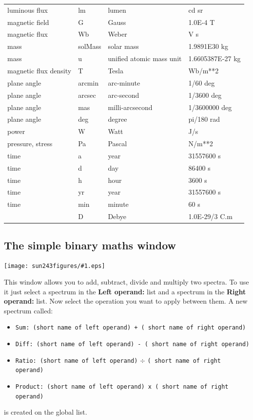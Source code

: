 \documentclass[twoside,11pt]{article}
\newcommand{\htmladdimg}[1]{}
\newcommand{\latexhtml}[2]{#1}
\renewcommand{\_}{\texttt{\symbol{95}}}
\newcommand{\mainfigure}[1]
{\begin{center}
 \latexhtml{\texttt{[image: sun243\_figures/\#1.eps]}}{\htmladdimg{#1.gif}}
 \end{center}
}
\newcommand{\labelitem}[1]{\textbf{#1}}
\newcommand{\hitext}[1]{\texttt{#1}}
\begin{document}
\begin{center}
\begin{tabular}{|l|l|l|l|}
luminous flux & lm & lumen & cd sr \\
magnetic field & G & Gauss & 1.0E-4 T \\
magnetic flux & Wb & Weber & V s \\
mass & solMass & solar mass & 1.9891E30 kg \\
mass & u & unified atomic mass unit & 1.6605387E-27 kg \\
magnetic flux density & T & Tesla & Wb/m**2 \\
plane angle  & arcmin & arc-minute & 1/60 deg \\
plane angle  & arcsec & arc-second & 1/3600 deg \\
plane angle  & mas & milli-arcsecond & 1/3600000 deg \\
plane angle & deg & degree & pi/180 rad \\
power & W & Watt & J/s \\
pressure, stress & Pa & Pascal & N/m**2 \\
time  & a & year & 31557600 s \\
time  & d & day & 86400 s \\
time  & h & hour & 3600 s \\
time  & yr & year & 31557600 s \\
time  & min & minute & 60 s \\
      & D & Debye & 1.0E-29/3 C.m \\
\hline
\end{tabular}
\end{center}

\newpage
\subsection{The simple binary maths window}

\mainfigure{binarymathwindow}

This window allows you to add, subtract, divide and multiply two spectra. To
use it just select a spectrum in the
\labelitem{Left operand:} list and a spectrum in the
\labelitem{Right operand:} list. Now select the operation you want to
apply between them. A new spectrum called:
\begin{itemize}
  \item \hitext{Sum: (short name of left operand) + ( short name of
        right operand)}
  \item \hitext{Diff: (short name of left operand) - ( short name of
        right operand)}
  \item \hitext{Ratio: (short name of left operand)} $\div$ \hitext{( short
        name of right operand)}
  \item \hitext{Product: (short name of left operand) x ( short name
        of right operand)}
\end{itemize}
is created on the global list.
\end{document}
